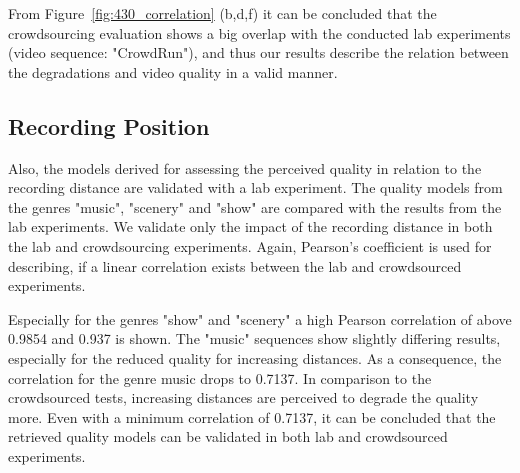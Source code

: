From Figure~\ref{fig:430_correlation} (b,d,f) it can be concluded that the crowdsourcing evaluation shows a big overlap with the conducted lab experiments (video sequence: "CrowdRun"), and thus our results describe the relation between the degradations and video quality in a valid manner.
\subsection{Recording Position}
Also, the models derived for assessing the perceived quality in relation to the recording distance are validated with a lab experiment.
The quality models from the genres "music", "scenery" and "show" are compared with the results from the lab experiments.
We validate only the impact of the recording distance in both the lab and crowdsourcing experiments.
Again, Pearson's coefficient is used for describing, if a linear correlation exists between the lab and crowdsourced experiments.

Especially for the genres "show" and "scenery" a high Pearson correlation of above 0.9854 and 0.937 is shown.
The "music" sequences show slightly differing results, especially for the reduced quality for increasing distances.
As a consequence, the correlation for the genre music drops to 0.7137.
In comparison to the crowdsourced tests, increasing distances are perceived to degrade the quality more. 
Even with a minimum correlation of 0.7137, it can be concluded that the retrieved quality models can be validated in both lab and crowdsourced experiments.
